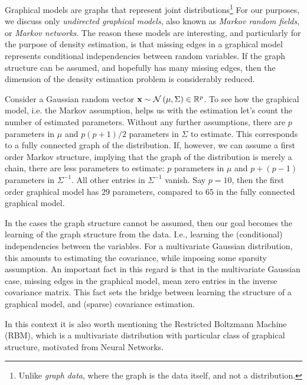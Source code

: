 Graphical models are graphs that represent joint distributions\footnote{Unlike \emph{graph data}, where the graph is the data itself, and not a distribution.}
For our purposes, we discuss only \emph{undirected graphical models}, also known as \emph{Markov random fields}, or \emph{Markov networks}.
The reason these models are interesting, and particularly for the purpose of density estimation, is that missing edges in a graphical model represents conditional independencies between random variables. 
If the graph structure can be assumed, and hopefully has many missing edges, then the dimension of the density estimation problem is considerably reduced. 

\begin{example}
Consider a Gaussian random vector $\mathbf{x} \sim \mathcal{N}\left(\mu, \Sigma\right)\in \mathbb{R}^p$.
To see how the graphical model, i.e. the Markov assumption, helps us with the estimation let's count the number of estimated parameters.
Without any further assumptions, there are $p$ parameters in $\mu$ and $p(p+1)/2$ parameters in $\Sigma$ to estimate.
This corresponds to a fully connected graph of the distribution.
If, however, we can assume a first order Markov structure, implying that the graph of the distribution is merely a chain, there are less parameters to estimate: $p$ parameters in $\mu$ and $p+(p-1)$ parameters in $\Sigma^{-1}$. All other entries in $\Sigma^{-1}$ vanish.
Say $p=10$, then the first order graphical model has $29$ parameters, compared to $65$ in the fully connected graphical model.


\end{example}


In the cases the graph structure cannot be assumed, then our goal becomes the learning of the graph structure from the data. I.e., learning the (conditional) independencies between the variables. For a multivariate Gaussian distribution, this amounts to estimating the covariance, while imposing some sparsity assumption. 
An important fact in this regard is that in the multivariate Gaussian case, missing edges in the graphical model, mean zero entries in the inverse covariance matrix. This fact sets the bridge between learning the structure of a graphical model, and (sparse) covariance estimation.


\begin{remark}
In this context it is also worth mentioning the Restricted Boltzmann Machine (RBM), which is a multivariate distribution with particular class of graphical structure, motivated from Neural Networks. 
\end{remark}



